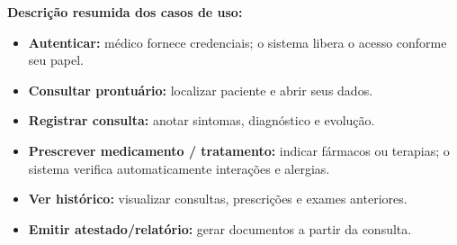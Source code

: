 \documentclass[11pt,a4paper]{article}
\begin{document}
\begin{resposta}
\textbf{Descrição resumida dos casos de uso:}
\begin{itemize}[nosep]
  \item \textbf{Autenticar:} médico fornece credenciais; o sistema libera o
        acesso conforme seu papel.
  \item \textbf{Consultar prontuário:} localizar paciente e abrir seus dados.
  \item \textbf{Registrar consulta:} anotar sintomas, diagnóstico e evolução.
  \item \textbf{Prescrever medicamento / tratamento:} indicar fármacos ou
        terapias; o sistema verifica automaticamente interações e alergias.
  \item \textbf{Ver histórico:} visualizar consultas, prescrições e exames
        anteriores.
  \item \textbf{Emitir atestado/relatório:} gerar documentos a partir da consulta.
\end{itemize}
\end{resposta}

\end{document}
